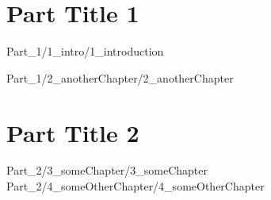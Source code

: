 \documentclass[titlepage,chapternotes]{utsthesis}
\begin{document}
\bibliographyunit[\chapter]

\Year{\thesisDate}


\prelimpages
%
\titlepage
\thesissignaturepage
\dedication{Dedication}
\abstract{
    \blindtext
}

\acknowledgments{
    \blindtext
}
\tableofcontents
\listoffigures
\listoftables
\abbreviations
\textpages
%

\part{Part Title 1}

{Part_1/1_intro/1_introduction}
\putbib

{Part_1/2_anotherChapter/2_anotherChapter}
\putbib

\part{Part Title 2}

{Part_2/3_someChapter/3_someChapter}
{Part_2/4_someOtherChapter/4_someOtherChapter}

%
%
\end{document}
